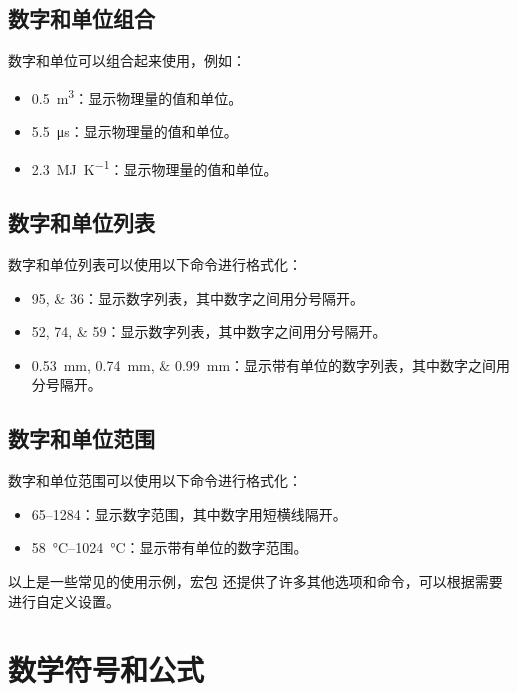 \subsection{数字和单位组合}

数字和单位可以组合起来使用，例如：

\begin{itemize}
  \item \SI{0.5}{\metre\cubed}：显示物理量的值和单位。
  \item \SI{5.5}{\micro\second}：显示物理量的值和单位。
  \item \SI{2.3}{\mega\joule\per\kelvin}：显示物理量的值和单位。
\end{itemize}

\subsection{数字和单位列表}

数字和单位列表可以使用以下命令进行格式化：

\begin{itemize}
  \item \numlist{95;36}：显示数字列表，其中数字之间用分号隔开。
  \item \numlist{52;74;59}：显示数字列表，其中数字之间用分号隔开。
  \item \SIlist{0.53;0.74;0.99}{\milli\metre}：显示带有单位的数字列表，其中数字之间用分号隔开。
\end{itemize}

\subsection{数字和单位范围}

数字和单位范围可以使用以下命令进行格式化：

\begin{itemize}
  \item \numrange{65}{1284}：显示数字范围，其中数字用短横线隔开。
  \item \SIrange{58}{1024}{\degreeCelsius}：显示带有单位的数字范围。
\end{itemize}

以上是一些常见的使用示例，宏包  还提供了许多其他选项和命令，可以根据需要进行自定义设置。

\section{数学符号和公式}

